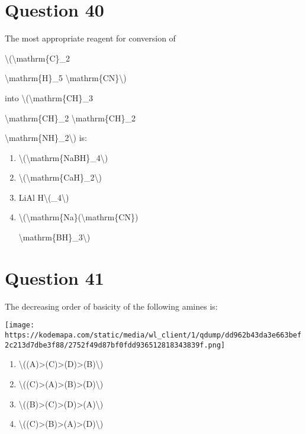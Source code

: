 \documentclass{article}
\begin{document}
\begin{enumerate}[label=(\alph*)]
\end{enumerate}
\newpage
\section*{Question 40}
The most appropriate reagent for conversion of

\textbackslash(\textbackslash mathrm\{C\}\_2

\textbackslash mathrm\{H\}\_5 \textbackslash mathrm\{CN\}\textbackslash)

into \textbackslash(\textbackslash mathrm\{CH\}\_3

\textbackslash mathrm\{CH\}\_2 \textbackslash mathrm\{CH\}\_2

\textbackslash mathrm\{NH\}\_2\textbackslash) is:


\begin{enumerate}[label=(\alph*)]
\item \textbackslash(\textbackslash mathrm\{NaBH\}\_4\textbackslash)


\item \textbackslash(\textbackslash mathrm\{CaH\}\_2\textbackslash)


\item LiAl H\textbackslash(\_4\textbackslash)


\item \textbackslash(\textbackslash mathrm\{Na\}(\textbackslash mathrm\{CN\})

\textbackslash mathrm\{BH\}\_3\textbackslash)


\end{enumerate}
\newpage
\section*{Question 41}
The decreasing order of basicity of the following amines is:



\texttt{[image: https://kodemapa.com/static/media/wl\_client/1/qdump/dd962b43da3e663bef2c213d7dbe3f88/2752f49d87bf0fdd936512818343839f.png]}\\


\begin{enumerate}[label=(\alph*)]
\item \textbackslash((A)\textgreater(C)\textgreater(D)\textgreater(B)\textbackslash)


\item \textbackslash((C)\textgreater(A)\textgreater(B)\textgreater(D)\textbackslash)


\item \textbackslash((B)\textgreater(C)\textgreater(D)\textgreater(A)\textbackslash)


\item \textbackslash((C)\textgreater(B)\textgreater(A)\textgreater(D)\textbackslash)


\end{enumerate}
\newpage
\end{document}

